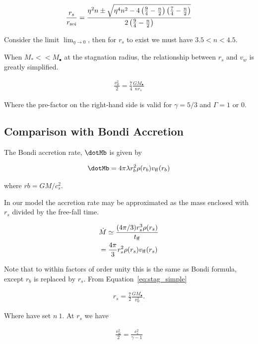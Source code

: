 \documentclass[usenatbib,fleqn]{mn2e}
\newcommand{\rs}{r_s}
\newcommand{\rb}{r_b}
\newcommand{\vw}{v_w}
\newcommand{\cs}{c_s}
\newcommand{\kew}{\frac{v_w^2}{2}}
\newcommand{\cs}{\frac{p}{\rho}}
\newcommand{\Mstar}{M_{*}}
\newcommand{\Mbh}[1][]{M_{\bullet#1}}
\newcommand{\soi}{\rm soi}
\newcommand{\ff}{\rm ff}
\newcommand{\rsoi}{r_{\soi}}
\newcommand{\x}{\frac{r_s}{\rsoi}}
\begin{document}
\begin{align}
\x=\frac{\eta^2 n \pm \sqrt{\eta^4 n^2 -4 \left(\frac{9}{4}-\frac{n}{2}\right) \left(\frac{7}{4}-\frac{n}{2}\right)}}{2\left(\frac{9}{4}-\frac{n}{2}\right)}
\end{align}

Consider the limit $\lim_{\eta \to 0}$, then for $\rs$ to exist we must have $3.5<n<4.5$.

When $\Mstar << \Mbh$ at the stagnation radius, the relationship between $\rs$ and $\vw$ is greatly simplified. 

\begin{align}
\kew=\frac{7}{4}\frac{G \Mbh}{n \rs}
\label{eq:stag_simple}
\end{align}

Where the pre-factor on the right-hand side is valid for $\gamma=5/3$ and $\Gamma=1$ or 0.  


\subsection{Comparison with Bondi Accretion}
The Bondi accretion rate, $\dotMb$ is given by 

\begin{align}
\dotMb=4\pi \lambda r_b^2 \rho(r_b) v_{\rm ff}(r_b)
\end{align}

where $rb=G M/\cs^2$.

In our model the accretion rate may be approximated as the mass enclosed with $\rs$ divided by the free-fall time.

\begin{align}
&\dot{M}\simeq\frac{(4 \pi/3) \rs^3 \rho(\rs)}{t_{\ff}}\\
&=\frac{4 \pi}{3} \rs^2 \rho(\rs) v_{\ff}(\rs)
\end{align}

Note that to within factors of order unity this is the same as Bondi formula, except $\rb$ is replaced by $\rs$. 
From Equation~\ref{eq:stag_simple}

\begin{align}
\rs=\frac{7}{2}\frac{G \Mbh}{\vw^2}.
\end{align}

Where have set $n~1$.  At $\rs$ we have

\begin{align}
\kew=\frac{c_s^2}{\gamma-1}
\end{align}
\end{document}
